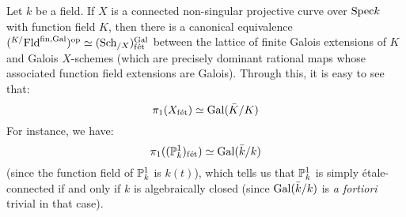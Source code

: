         \begin{example} \label{example: etale_fundamental_group_of_a_curve}
            Let $k$ be a field. If $X$ is a connected non-singular projective curve over $\Spec k$ with function field $K$, then there is a canonical equivalence $({}^{K/}\Fld^{\fin, \Gal})^{\op} \cong (\Sch_{/X})_{\fet}^{\Gal}$ between the lattice of finite Galois extensions of $K$ and Galois $X$-schemes (which are precisely dominant rational maps whose associated function field extensions are Galois). Through this, it is easy to see that:
                $$\pi_1(X_{\fet}) \cong \Gal(\bar{K}/K)$$
            For instance, we have:
                $$\pi_1((\P^1_k)_{\fet}) \cong \Gal(\bar{k}/k)$$
            (since the function field of $\P^1_k$ is $k(t)$), which tells us that $\P^1_k$ is simply \'etale-connected if and only if $k$ is algebraically closed (since $\Gal(\bar{k}/k)$ is \textit{a fortiori} trivial in that case). 
            

\end{example}
